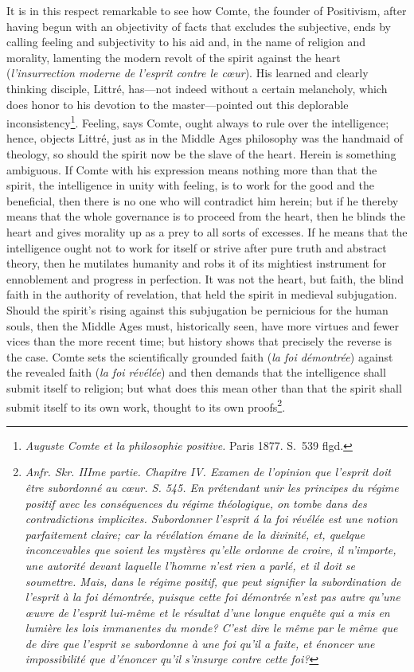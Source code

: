 \documentclass[12pt]{article}
\begin{document}
It is in this respect remarkable to see how Comte, the founder of Positivism,
after having begun with an objectivity of facts that excludes the subjective,
ends by calling feeling and subjectivity to his aid and, in the name of
religion and morality, lamenting the modern revolt of the spirit against the
heart (\textit{l'insurrection moderne de l'esprit contre le cœur}). His
learned and clearly thinking disciple, Littré, has—not indeed without a
certain melancholy, which does honor to his devotion to the master—pointed
out this deplorable inconsistency\footnote{\textit{Auguste Comte et la
philosophie positive.} Paris 1877. S.\ 539 flgd.}. Feeling, says Comte, ought
always to rule over the intelligence; hence, objects Littré, just as in the
Middle Ages philosophy was the handmaid of theology, so should the spirit now
be the slave of the heart. Herein is something ambiguous. If Comte with his
expression means nothing more than that the spirit, the intelligence in unity
with feeling, is to work for the good and the beneficial, then there is no
one who
will contradict him herein; but if he thereby means that the whole governance
is to proceed from the heart, then he blinds the heart and gives morality up
as a prey to all sorts of excesses. If he means that the intelligence ought
not to work for itself or strive after pure truth and abstract theory, then he
mutilates humanity and robs it of its mightiest instrument for ennoblement and
progress in perfection. It was not the heart, but faith, the blind faith in
the authority of revelation, that held the spirit in medieval subjugation.
Should the spirit's rising against this subjugation be pernicious for the
human souls, then the Middle Ages must, historically seen, have more virtues
and fewer vices than the more recent time; but history shows that precisely
the reverse is the case. Comte sets the scientifically grounded faith
(\textit{la foi démontrée}) against the revealed faith (\textit{la foi
révélée}) and then demands that the intelligence shall submit itself to
religion; but what does this mean other than that the spirit shall submit
itself to its own work, thought to its own proofs\footnote{\textit{Anfr. Skr.
IIIme partie. Chapitre IV. Examen de l'opinion que l'esprit doit être
subordonné au cœur. S. 545. En prétendant unir les principes du régime
positif avec les conséquences du régime théologique, on tombe dans des
contradictions implicites. Subordonner l'esprit á la foi révélée est une
notion parfaitement claire; car la révélation émane de la divinité, et,
quelque inconcevables que soient les mystères qu'elle ordonne de croire, il
n'importe, une autorité devant laquelle l'homme n'est rien a parlé, et il doit
se soumettre. Mais, dans le régime positif, que peut signifier la
subordination de l'esprit à la foi démontrée, puisque cette foi démontrée
n'est pas autre qu'une œuvre de l'esprit lui-même et le résultat d'une longue
enquête qui a mis en lumière les lois immanentes du monde? C'est dire le même
par le même que de dire que l'esprit se subordonne à une foi qu'il a faite, et
énoncer une impossibilité que d'énoncer qu'il s'insurge contre cette foi?}}.
\end{document}
